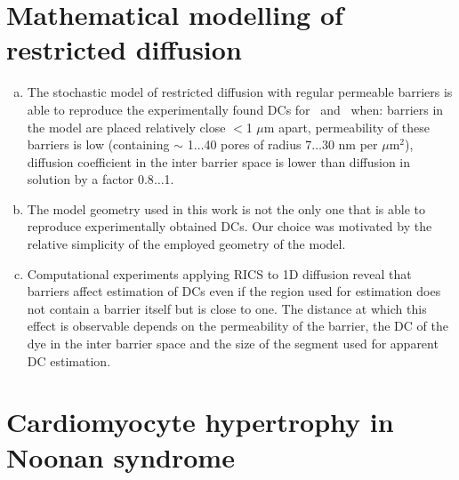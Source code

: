 \section*{Mathematical modelling of restricted diffusion}
\begin{enumerate}[a)]
    \setcounter{enumi}{\value{saveenum}}
    \item The stochastic model of restricted diffusion with regular permeable
barriers is able to reproduce the experimentally found \acp{DC} for
\ATP\ and \DEX\ when: barriers in the model are placed relatively close
$<$1 $\mu$m apart, permeability of these barriers is low (containing
$\sim$ 1$\ldots$40 pores of radius 7$\ldots$30 nm per $\mu$m$^2$),
diffusion coefficient in the inter barrier space is lower than diffusion
in solution by a factor 0.8$\ldots$1.

\item The model geometry used in this work is not the only one that is able to
reproduce experimentally obtained \acp{DC}. Our choice was motivated by
the relative simplicity of the employed geometry of the model. 

\item Computational experiments applying \ac{RICS} to 1D diffusion reveal
that barriers affect estimation of \acp{DC} even if the region used for
estimation does not contain a barrier itself but is close to one. The
distance at which this effect is observable depends on the permeability
of the barrier, the \ac{DC} of the dye in the inter barrier space
and the size of the segment used for apparent \ac{DC} estimation.

\setcounter{saveenum}{\value{enumi}}

\end{enumerate}
\section*{Cardiomyocyte hypertrophy in Noonan syndrome}

